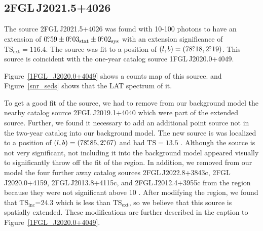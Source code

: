 \documentclass[12pt,preprint]{aastex}
\newcommand{\gev}{\text{GeV}\xspace}
\newcommand{\tsext}{{\ensuremath{\text{TS}_{\text{ext}}}}\xspace}
\newcommand{\tsinc}{\ensuremath{\text{TS}_{\text{inc}}}\xspace}
\newcommand{\ts}{\text{TS}\xspace}
\newcommand{\sys}{\text{sys}\xspace}
\newcommand{\stat}{\text{stat}\xspace}
\newcommand{\hl}[1]{#1}
\begin{document}
\subsection{2FGL\,J2021.5+4026}
\label{section_2FGL J2021.5+4026}



The source 2FGL\,J2021.5+4026 was found with 10-100 \gev
photons to have an extension of $0\fdg59\pm0\fdg03_\stat\pm0\fdg02_\sys$
with an extension significance of $\tsext=116.4$.  The source was
fit to a position of $(l,b)=(78\mbox{$.\!\!^\circ$}18,2\mbox{$.\!\!^\circ$}19)$.  This source
is coincident with the one-year catalog source 1FGL\,J2020.0+4049.
\hl{
Figure~\ref{1FGL_J2020.0+4049} shows a counts map of this source.
and Figure~\ref{snr_seds} shows that the LAT spectrum of it.
}


To get a good fit of the source, we had to remove from our background
model the nearby catalog
source 2FGL\,J2019.1+4040 which were part of the extended source.
Further, we found it necessary to add an additional point source not in
the two-year catalog into our background model.  The new source is was
localized to a position of $(l,b)=(78\mbox{$.\!\!^\circ$}85,2\mbox{$.\!\!^\circ$}67)$ and had $\ts=13.5$ .
Although the source is not very significant, not including it into the
background model appeared visually to significantly throw off the fit
of the region.  In addition, we removed from our model the four further away catalog
sources 2FGL\,J2022.8+3843c, 2FGL\,J2020.0+4159, 2FGL\,J2013.8+4115c,
and 2FGL\,J2012.4+3955c from the region because they were not significant
above 10 \gev.  After modifying the region, we found that \tsinc=24.3
which is less than \tsext, so we believe that this source is spatially
extended.  These modifications are further described in the caption to
Figure~\ref{1FGL_J2020.0+4049}.
\end{document}
